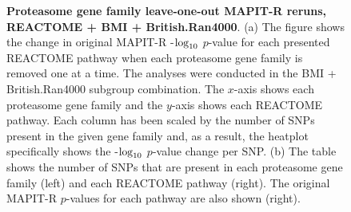 \documentclass[12pt,a4paper]{article}
\def\log{{\rm log}}
\begin{document}
\begin{figure}[ht]
\centering
\vspace*{-.5cm}
\par
{}
\caption[TBD]{\textbf{Proteasome gene family leave-one-out MAPIT-R reruns, REACTOME + BMI + British.Ran4000}. (a) The figure shows the change in original MAPIT-R -$\log_{10}$ $p$-value for each presented REACTOME pathway when each proteasome gene family is removed one at a time. The analyses were conducted in the BMI + British.Ran4000 subgroup combination. The $x$-axis shows each proteasome gene family and the $y$-axis shows each REACTOME pathway. Each column has been scaled by the number of SNPs present in the given gene family and, as a result, the heatplot specifically shows the -$\log_{10}$ $p$-value change per SNP. (b) The table shows the number of SNPs that are present in each proteasome gene family (left) and each REACTOME pathway (right). The original MAPIT-R $p$-values for each pathway are also shown (right).}

\end{figure}
\end{document}
